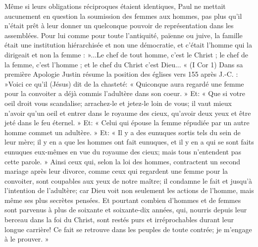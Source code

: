 Même si leurs obligations réciproques étaient identiques, Paul ne mettait aucunement en question la soumission des femmes aux hommes, pas plus qu'il n'était prêt à leur donner un quelconque pouvoir de représentation dans les assemblées. Pour lui comme pour toute l'antiquité, païenne ou juive, la famille était une institution hiérarchisée et non une démocratie, et c'était l'homme qui la dirigeait et non la femme : »...Le chef de tout homme, c'est le Christ ; le chef de la femme, c'est l'homme ; et le chef du Christ c'est Dieu... « (I Cor 1) 
 Dans sa première Apologie Justin résume la position des églises vers 155 après J.-C. : »Voici ce qu'il (Jésus) dit de la chasteté: « Quiconque aura regardé une femme pour la convoiter a déjà commis l'adultère dans son coeur. » Et: « Que si votre oeil droit vous scandalise; arrachez-le et jetez-le loin de vous; il vaut mieux n'avoir qu'un oeil et entrer dans le royaume des cieux, qu'avoir deux yeux et être jeté dans le feu éternel. » Et: « Celui qui épouse la femme répudiée par un autre homme commet un adultère. » Et: « Il y a des eunuques sortis tels du sein de leur mère; il y en a que les hommes ont fait eunuques, et il y en a qui se sont faits eunuques eux-mêmes en vue du royaume des cieux; mais tous n'entendent pas cette parole. » Ainsi ceux qui, selon la loi des hommes, contractent un second mariage après leur divorce, comme ceux qui regardent une femme pour la convoiter, sont coupables aux yeux de notre maître; il condamne le fait et jusqu'à l'intention de l'adultère; car Dieu voit non seulement les actions de l'homme, mais même ses plus secrètes pensées. Et pourtant combien d'hommes et de femmes sont parvenus à plus de soixante et soixante-dix années, qui, nourris depuis leur berceau dans la foi du Christ, sont restés purs et irréprochables durant leur longue carrière! Ce fait se retrouve dans les peuples de toute contrée; je m'engage à le prouver. » 
